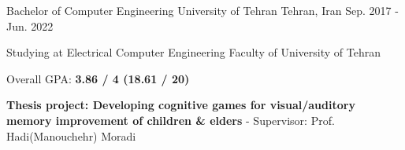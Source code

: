

\begin{cventries}

  

  \cventry
    {Bachelor of Computer Engineering} %
    {University of Tehran} %
    {Tehran, Iran} %
    {Sep. 2017 - Jun. 2022} %
    {
      \begin{cvitems} %
        \item {Studying at Electrical Computer Engineering Faculty of University of Tehran}
        \item {Overall GPA: \textbf{3.86 / 4 (18.61 / 20)}}
        \item {\textbf{Thesis project: Developing cognitive games for visual/auditory memory improvement of children \& elders} - Supervisor: Prof. Hadi(Manouchehr) Moradi}
      \end{cvitems}
    }


\end{cventries}
